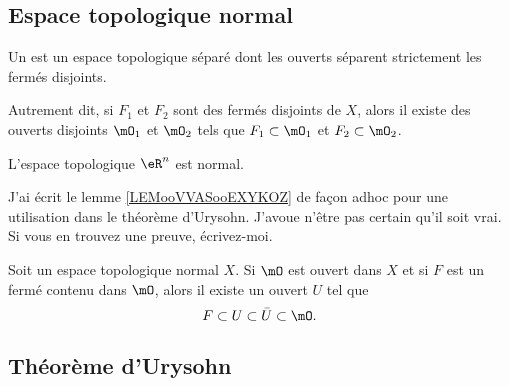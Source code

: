 \subsection{Espace topologique normal}

\begin{definition}      \label{DEFooNNKVooLtzImT}
	Un  est un espace topologique séparé dont les ouverts séparent strictement les fermés disjoints.

	Autrement dit, si \( F_1\) et \( F_2\) sont des fermés disjoints de \( X\), alors il existe des ouverts disjoints \( \mO_1\) et \( \mO_2\) tels que  \( F_1\subset\mO_1\) et \( F_2\subset \mO_2\).
\end{definition}

\begin{proposition}     \label{PROPooWSKZooHKvuob}
	L'espace topologique \( \eR^n\) est normal.
\end{proposition}


\begin{probleme}
	J'ai écrit le lemme \ref{LEMooVVASooEXYKOZ} de façon adhoc pour une utilisation dans le théorème d'Urysohn. J'avoue n'être pas certain qu'il soit vrai. Si vous en trouvez une preuve, écrivez-moi.
\end{probleme}

\begin{lemma}        \label{LEMooVVASooEXYKOZ}
	Soit un espace topologique normal \( X\). Si \( \mO\) est ouvert dans \( X\) et si \( F\) est un fermé contenu dans \( \mO\), alors il existe un ouvert \( U\) tel que
	\begin{equation}
		F\subset U\subset\bar U\subset \mO.
	\end{equation}
\end{lemma}


\subsection{Théorème d'Urysohn}


